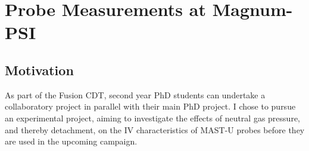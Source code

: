 \documentclass[a4paper, 12pt]{article} %
\begin{document}


\section{\label{sec:magnumprobes}Probe Measurements at Magnum-PSI}
\subsection{Motivation}
	As part of the Fusion CDT, second year PhD students can undertake a collaboratory project in parallel with their main PhD project. 
	I chose to pursue an experimental project, aiming to investigate the effects of neutral gas pressure, and thereby detachment, on the IV characteristics of MAST-U probes before they are used in the upcoming campaign.
	
\end{document}
